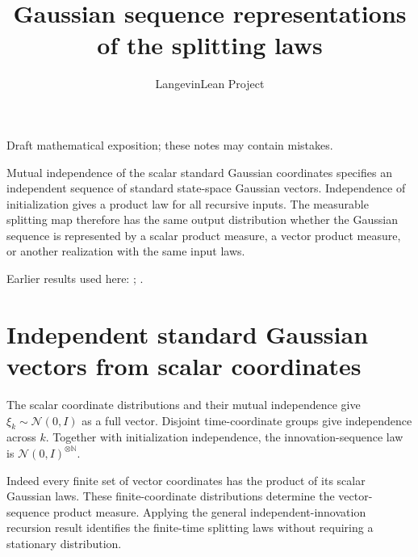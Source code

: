 \documentclass[11pt,a4paper]{article}
\title{\texorpdfstring{Gaussian sequence representations of the splitting laws}{Gaussian sequence representations of the splitting laws}}
\author{LangevinLean Project}
\date{}
\begin{document}
\maketitle
Draft mathematical exposition; these notes may contain mistakes.


Mutual independence of the scalar standard Gaussian coordinates specifies an independent sequence of standard state-space Gaussian vectors. Independence of initialization gives a product law for all recursive inputs. The measurable splitting map therefore has the same output distribution whether the Gaussian sequence is represented by a scalar product measure, a vector product measure, or another realization with the same input laws.



Earlier results used here: \cite[Section~3.15]{LangevinLean2026IPLA}; \cite[Section~3.41]{LangevinLean2026ULASC}.

\section{\texorpdfstring{Independent standard Gaussian vectors from scalar coordinates}{Independent standard Gaussian vectors from scalar coordinates}}


The scalar coordinate distributions and their mutual independence give \(\xi_k\sim\mathcal N(0,I)\) as a full vector. Disjoint time-coordinate groups give independence across \(k\). Together with initialization independence, the innovation-sequence law is \(\mathcal N(0,I)^{\otimes\mathbb N}\).



Indeed every finite set of vector coordinates has the product of its scalar Gaussian laws. These finite-coordinate distributions determine the vector-sequence product measure. Applying the general independent-innovation recursion result identifies the finite-time splitting laws without requiring a stationary distribution.
\end{document}
